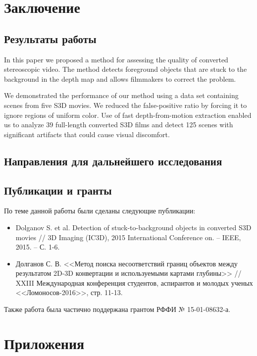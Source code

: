 \documentclass[14pt, a4paper]{extarticle}
\begin{document}
\newpage
\section{Заключение}

\subsection{Результаты работы}

In this paper we proposed a method for assessing the quality of converted stereoscopic video.
The method detects foreground objects that are stuck to the background in the depth map and allows
filmmakers to correct the problem.

We demonstrated the performance of our method using a data set containing 
scenes from five S3D movies. We reduced the false-positive ratio by forcing it 
to ignore regions of uniform color. Use of fast depth-from-motion extraction enabled 
us to analyze 39 full-length converted S3D films and detect 125 scenes with significant 
artifacts that could cause visual discomfort.

\subsection{Направления для дальнейшего исследования}

\subsection{Публикации и гранты}

По теме данной работы были сделаны следующие публикации:

\begin{itemize}
	\item Dolganov S. et al. Detection of stuck-to-background objects in converted S3D movies // 3D Imaging (IC3D), 2015 International Conference on. – IEEE, 2015. – С. 1-6.
	\item Долганов С. В. <<Метод поиска несоответствий границ объектов между результатом 2D-3D конвертации и используемыми картами глубины>> // XXIII Международная конференция студентов, аспирантов и молодых ученых <<Ломоносов-2016>>, стр. 11-13.
\end{itemize}

Также работа была частично поддержана грантом РФФИ № 15-01-08632-а.

\newpage
\section{Приложения}

\newpage


\end{document}
